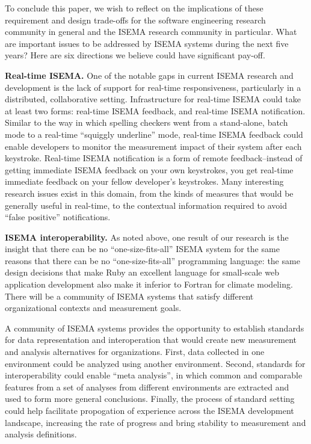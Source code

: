 \documentclass[10pt,twocolumn]{article}
\begin{document}
To conclude this paper, we wish to reflect on the implications of these
requirement and design trade-offs for the software engineering research
community in general and the ISEMA research community in particular.  What
are important issues to be addressed by ISEMA systems during the next five
years? Here are six directions we believe could have significant pay-off. 

{\bf Real-time ISEMA.} One of the notable gaps in current ISEMA
research and development is the lack of support for real-time
responsiveness, particularly in a distributed, collaborative setting.
Infrastructure for real-time ISEMA could take at least two forms: real-time
ISEMA feedback, and real-time ISEMA notification.  Similar to the way in
which spelling checkers went from a stand-alone, batch mode to a real-time
``squiggly underline'' mode, real-time ISEMA feedback could enable
developers to monitor the measurement impact of their system after each
keystroke.  Real-time ISEMA notification is a form of remote
feedback--instead of getting immediate ISEMA feedback on your own
keystrokes, you get real-time immediate feedback on your fellow developer's
keystrokes.  Many interesting research issues exist in this domain, from the 
kinds of measures that would be generally useful in real-time, to the contextual
information required to avoid ``false positive'' notifications. 

{\bf ISEMA interoperability.}  As noted above, one result of our research
is the insight that there can be no ``one-size-fits-all'' ISEMA system for
the same reasons that there can be no ``one-size-fits-all'' programming
language: the same design decisions that make Ruby an excellent language
for small-scale web application development also make it inferior to
Fortran for climate modeling.  There will be a community of ISEMA systems
that satisfy different organizational contexts and measurement goals.

A community of ISEMA systems provides the opportunity to establish
standards for data representation and interoperation that would create new
measurement and analysis alternatives for organizations.  First, data
collected in one environment could be analyzed using another environment.
Second, standards for interoperability could enable ``meta analysis'', in
which common and comparable features from a set of analyses from different
environments are extracted and used to form more general
conclusions. Finally, the process of standard setting could help facilitate
propogation of experience across the ISEMA development landscape,
increasing the rate of progress and bring stability to measurement and
analysis definitions.
\end{document}
